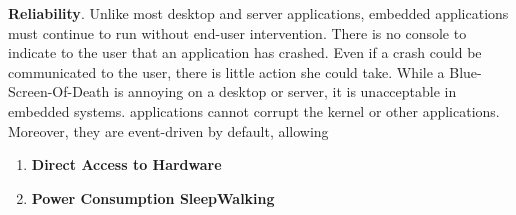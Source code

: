 {\bf Reliability}. Unlike most desktop and server applications, embedded
applications must continue to run without end-user intervention. There is no
console to indicate to the user that an application has crashed. Even if a crash
could be communicated to the user, there is little action she could take. While
a Blue-Screen-Of-Death is annoying on a desktop or server, it is
unacceptable in embedded systems. \name applications cannot corrupt the kernel
or other applications. Moreover, they are event-driven by default, allowing 

\begin{enumerate}

\item {\bf Direct Access to Hardware}

\item {\bf Power Consumption SleepWalking}
\end{enumerate}
